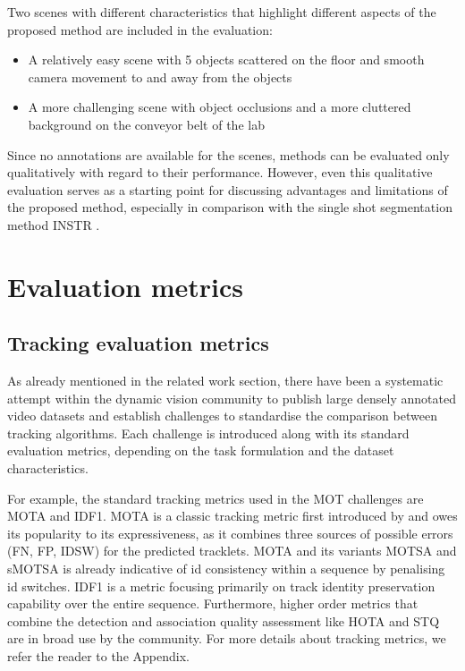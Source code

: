 Two scenes with different characteristics that highlight different aspects of the proposed method are included in the evaluation:

\begin{itemize}
    \item A relatively easy scene with 5 objects scattered on the floor and smooth camera movement to and away from the objects
    \item A more challenging scene with object occlusions and a more cluttered background on the conveyor belt of the lab
\end{itemize}

Since no annotations are available for the scenes, methods can be evaluated only qualitatively with regard to their performance. However, even this qualitative evaluation serves as a starting point for discussing advantages and limitations of the proposed method, especially in comparison with the single shot segmentation method INSTR \parencite{durner2021unknown}.



\section{Evaluation metrics}
\subsection{Tracking evaluation metrics}
As already mentioned in the related work section, there have been a systematic attempt within the dynamic vision community to publish large densely annotated video datasets and establish challenges to standardise the comparison between tracking algorithms. Each challenge is introduced along with its standard evaluation metrics, depending on the task formulation and the dataset characteristics.\par


For example, the standard tracking metrics used in the \gls{MOT} challenges are MOTA and IDF1. 
MOTA is a classic tracking metric first introduced by \cite{MOTAmetric} and
owes its popularity to its expressiveness, as it combines three sources of possible errors (\gls{FN}, \gls{FP}, \gls{IDSW}) for the predicted tracklets. MOTA and its variants MOTSA and sMOTSA is already indicative of id consistency within a sequence by penalising id switches. IDF1 is a metric focusing primarily on track identity preservation capability over the entire sequence. Furthermore, higher order metrics that combine the detection and association quality assessment like HOTA \parencite{hota} and STQ \parencite{step} are in broad use by the community. For more details about tracking metrics, we refer the reader to the Appendix.\par


